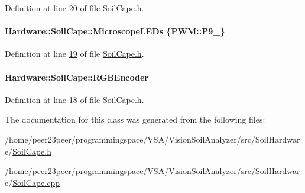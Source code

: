 Definition at line \hyperlink{_soil_cape_8h_source_l00020}{20} of file \hyperlink{_soil_cape_8h_source}{Soil\+Cape.\+h}.

\hypertarget{class_hardware_1_1_soil_cape_a80d499485dddb861cddaffa439b655dd}{}
\paragraph[{Microscope\+L\+E\+Ds}]{ Hardware\+::\+Soil\+Cape\+::\+Microscope\+L\+E\+Ds \{{\bf P\+W\+M\+::\+P9\+\_}\}}\label{class_hardware_1_1_soil_cape_a80d499485dddb861cddaffa439b655dd}


Definition at line \hyperlink{_soil_cape_8h_source_l00019}{19} of file \hyperlink{_soil_cape_8h_source}{Soil\+Cape.\+h}.

\hypertarget{class_hardware_1_1_soil_cape_a0e68dc6f30fdcbff0462d2996e47a338}{}
\paragraph[{R\+G\+B\+Encoder}]{ Hardware\+::\+Soil\+Cape\+::\+R\+G\+B\+Encoder}\label{class_hardware_1_1_soil_cape_a0e68dc6f30fdcbff0462d2996e47a338}


Definition at line \hyperlink{_soil_cape_8h_source_l00018}{18} of file \hyperlink{_soil_cape_8h_source}{Soil\+Cape.\+h}.



The documentation for this class was generated from the following files\+:\begin{DoxyCompactItemize}
\item 
/home/peer23peer/programmingspace/\+V\+S\+A/\+Vision\+Soil\+Analyzer/src/\+Soil\+Hardware/\hyperlink{_soil_cape_8h}{Soil\+Cape.\+h}\item 
/home/peer23peer/programmingspace/\+V\+S\+A/\+Vision\+Soil\+Analyzer/src/\+Soil\+Hardware/\hyperlink{_soil_cape_8cpp}{Soil\+Cape.\+cpp}\end{DoxyCompactItemize}
